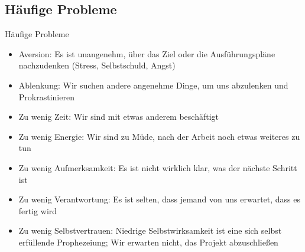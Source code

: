 \subsection{Häufige Probleme}

\begin{frame}[c]{Häufige Probleme}
    \footnotesize
    \begin{itemize}[<+(1)->]
        \item Aversion: Es ist unangenehm, über das Ziel oder die Ausführungspläne nachzudenken (Stress, Selbstschuld, Angst)
        \item Ablenkung: Wir suchen andere angenehme Dinge, um uns abzulenken und Prokrastinieren
        \item Zu wenig Zeit: Wir sind mit etwas anderem beschäftigt
        \item Zu wenig Energie: Wir sind zu Müde, nach der Arbeit noch etwas weiteres zu tun
        \item Zu wenig Aufmerksamkeit: Es ist nicht wirklich klar, was der nächste Schritt ist
        \item Zu wenig Verantwortung: Es ist selten, dass jemand von uns erwartet, dass es fertig wird
        \item Zu wenig Selbstvertrauen: Niedrige Selbstwirksamkeit ist eine sich selbst erfüllende Prophezeiung; Wir erwarten nicht, das Projekt abzuschließen
    \end{itemize}
\end{frame}


